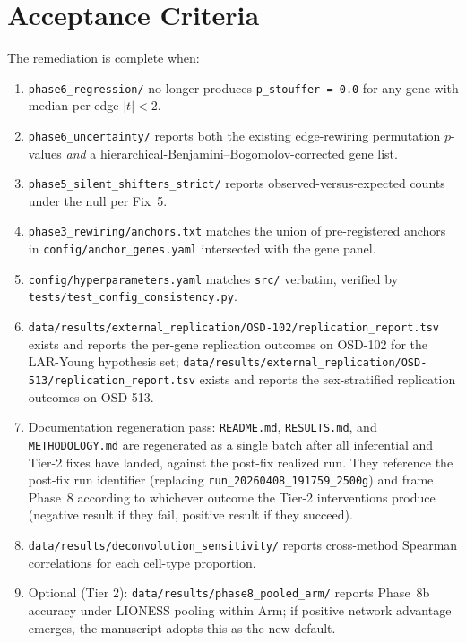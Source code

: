 \documentclass[11pt]{article}
\newcommand{\code}[1]{\texttt{#1}}
\begin{document}
\section{Acceptance Criteria}

The remediation is complete when:

\begin{enumerate}[leftmargin=*]
\item \code{phase6\_regression/} no longer produces \code{p\_stouffer = 0.0} for any gene with median per-edge $|t|<2$.
\item \code{phase6\_uncertainty/} reports both the existing edge-rewiring permutation $p$-values \emph{and} a hierarchical-Benjamini--Bogomolov-corrected gene list.
\item \code{phase5\_silent\_shifters\_strict/} reports observed-versus-expected counts under the null per Fix~5.
\item \code{phase3\_rewiring/anchors.txt} matches the union of pre-registered anchors in \code{config/anchor\_genes.yaml} intersected with the gene panel.
\item \code{config/hyperparameters.yaml} matches \code{src/} verbatim, verified by \code{tests/test\_config\_consistency.py}.
\item \code{data/results/external\_replication/OSD-102/replication\_report.tsv} exists and reports the per-gene replication outcomes on OSD-102 for the LAR-Young hypothesis set; \code{data/results/external\_replication/OSD-513/replication\_report.tsv} exists and reports the sex-stratified replication outcomes on OSD-513.
\item Documentation regeneration pass: \code{README.md}, \code{RESULTS.md}, and \code{METHODOLOGY.md} are regenerated as a single batch after all inferential and Tier-2 fixes have landed, against the post-fix realized run. They reference the post-fix run identifier (replacing \code{run\_20260408\_191759\_2500g}) and frame Phase~8 according to whichever outcome the Tier-2 interventions produce (negative result if they fail, positive result if they succeed).
\item \code{data/results/deconvolution\_sensitivity/} reports cross-method Spearman correlations for each cell-type proportion.
\item Optional (Tier 2): \code{data/results/phase8\_pooled\_arm/} reports Phase~8b accuracy under LIONESS pooling within Arm; if positive network advantage emerges, the manuscript adopts this as the new default.
\end{enumerate}
\end{document}

